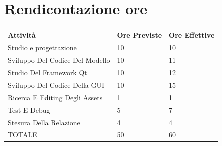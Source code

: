 \documentclass{article}
\begin{document}
\section{Rendicontazione ore} 

\begin{table}[!ht]
    \centering
    \begin{tabular}{|l|l|l|}
    \hline
        Attività & Ore Previste & Ore Effettive \\ \hline
        Studio e progettazione & 10 & 10 \\ \hline
        Sviluppo Del Codice Del Modello & 10 & 11 \\ \hline
        Studio Del Framework Qt & 10 & 12 \\ \hline
        Sviluppo Del Codice Della GUI & 10 & 15 \\ \hline
        Ricerca E Editing Degli Assets & 1 & 1 \\ \hline
        Test E Debug & 5 & 7 \\ \hline
        Stesura Della Relazione & 4 & 4 \\ \hline
        TOTALE & 50 & 60 \\ \hline
    \end{tabular}
\end{table}
\end{document}
